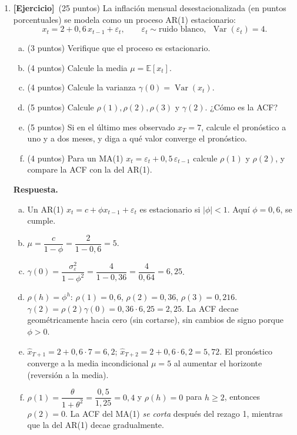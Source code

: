 \documentclass[12pt,letterpaper]{article}
\DeclareMathOperator{\var}{Var}
\newcommand{\E}[1]{\mathbb{E}\left[#1\right]}
\newenvironment{resp}{\begingroup\color{blue}\par\noindent\textbf{Respuesta.}\ }{\par\endgroup}
\newcommand{\ejer}{\textbf{[Ejercicio]}}
\begin{document}
\begin{enumerate}[1.]
\item \ejer\ (25 puntos) La inflación mensual desestacionalizada (en puntos porcentuales) se modela como un proceso AR(1) estacionario:
\[
x_t=2+0{,}6\,x_{t-1}+\varepsilon_t,\qquad \varepsilon_t\sim\text{ruido blanco},\ \ \var(\varepsilon_t)=4 .
\]
\begin{enumerate}[a)]
\item (3 puntos) Verifique que el proceso es estacionario.
\item (4 puntos) Calcule la media $\mu=\E{x_t}$.
\item (4 puntos) Calcule la varianza $\gamma(0)=\var(x_t)$.
\item (5 puntos) Calcule $\rho(1),\rho(2),\rho(3)$ y $\gamma(2)$. ¿Cómo es la ACF?
\item (5 puntos) Si en el último mes observado $x_T=7$, calcule el pronóstico a uno y a dos meses, y diga a qué valor converge el pronóstico.
\item (4 puntos) Para un MA(1) $x_t=\varepsilon_t+0{,}5\,\varepsilon_{t-1}$ calcule $\rho(1)$ y $\rho(2)$, y compare la ACF con la del AR(1).
\end{enumerate}

\begin{resp}
\begin{enumerate}[a)]
\item Un AR(1) $x_t=c+\phi x_{t-1}+\varepsilon_t$ es estacionario si $|\phi|<1$. Aquí $\phi=0{,}6$, se cumple.
\item $\mu=\dfrac{c}{1-\phi}=\dfrac{2}{1-0{,}6}=5$.
\item $\gamma(0)=\dfrac{\sigma^2_\varepsilon}{1-\phi^2}=\dfrac{4}{1-0{,}36}=\dfrac{4}{0{,}64}=6{,}25$.
\item $\rho(h)=\phi^h$: $\rho(1)=0{,}6$, $\rho(2)=0{,}36$, $\rho(3)=0{,}216$. $\gamma(2)=\rho(2)\gamma(0)=0{,}36\cdot6{,}25=2{,}25$. La ACF decae geométricamente hacia cero (sin cortarse), sin cambios de signo porque $\phi>0$.
\item $\hat x_{T+1}=2+0{,}6\cdot7=6{,}2$; $\hat x_{T+2}=2+0{,}6\cdot6{,}2=5{,}72$. El pronóstico converge a la media incondicional $\mu=5$ al aumentar el horizonte (reversión a la media).
\item $\rho(1)=\dfrac{\theta}{1+\theta^2}=\dfrac{0{,}5}{1{,}25}=0{,}4$ y $\rho(h)=0$ para $h\geq2$, entonces $\rho(2)=0$. La ACF del MA(1) \emph{se corta} después del rezago 1, mientras que la del AR(1) decae gradualmente.
\end{enumerate}
\end{resp}
\end{enumerate}
\end{document}
